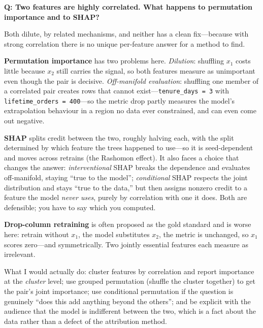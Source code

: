 \begin{interviewq}
\textbf{Q: Two features are highly correlated. What happens to permutation importance and to SHAP?}

 \quad {} \quad \badgefreq{\freqmed}

\stronganswer

Both dilute, by related mechanisms, and neither has a clean fix---because with strong correlation there is no unique per-feature answer for a method to find.

\textbf{Permutation importance} has two problems here. \emph{Dilution}: shuffling $x_1$ costs little because $x_2$ still carries the signal, so both features measure as unimportant even though the pair is decisive. \emph{Off-manifold evaluation}: shuffling one member of a correlated pair creates rows that cannot exist---\texttt{tenure\_days = 3} with \texttt{lifetime\_orders = 400}---so the metric drop partly measures the model's extrapolation behaviour in a region no data ever constrained, and can even come out negative.

\textbf{SHAP} splits credit between the two, roughly halving each, with the split determined by which feature the trees happened to use---so it is seed-dependent and moves across retrains (the Rashomon effect). It also faces a choice that changes the answer: \emph{interventional} SHAP breaks the dependence and evaluates off-manifold, staying ``true to the model''; \emph{conditional} SHAP respects the joint distribution and stays ``true to the data,'' but then assigns nonzero credit to a feature the model \emph{never uses}, purely by correlation with one it does. Both are defensible; you have to say which you computed.

\textbf{Drop-column retraining} is often proposed as the gold standard and is worse here: retrain without $x_1$, the model substitutes $x_2$, the metric is unchanged, so $x_1$ scores zero---and symmetrically. Two jointly essential features each measure as irrelevant.

What I would actually do: cluster features by correlation and report importance at the \emph{cluster} level; use grouped permutation (shuffle the cluster together) to get the pair's joint importance; use conditional permutation if the question is genuinely ``does this add anything beyond the others''; and be explicit with the audience that the model is indifferent between the two, which is a fact about the data rather than a defect of the attribution method.


\end{interviewq}
